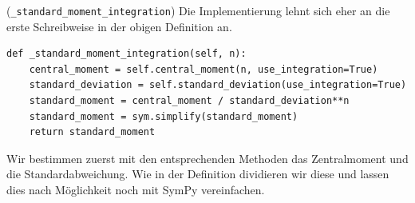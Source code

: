 \begin{Code}{(\lstinline|_standard_moment_integration|)}
Die Implementierung lehnt sich eher an die erste Schreibweise in der obigen Definition an.
\begin{lstlisting}
def _standard_moment_integration(self, n):
    central_moment = self.central_moment(n, use_integration=True)
    standard_deviation = self.standard_deviation(use_integration=True)
    standard_moment = central_moment / standard_deviation**n
    standard_moment = sym.simplify(standard_moment)
    return standard_moment
\end{lstlisting}
Wir bestimmen zuerst mit den entsprechenden Methoden das Zentralmoment und die Standardabweichung. Wie in der Definition dividieren wir diese und lassen dies nach Möglichkeit noch mit SymPy vereinfachen.
\end{Code}

\vspace*{-\medskipamount}

